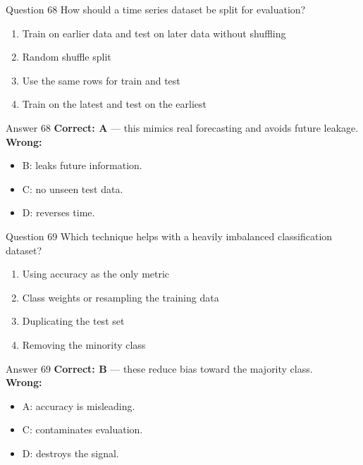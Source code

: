 \documentclass[aspectratio=169,11pt]{beamer}
\begin{document}
	\begin{frame}{Question 68}
		How should a time series dataset be split for evaluation?
		\begin{enumerate}[label=\Alph*.]
			\item Train on earlier data and test on later data without shuffling
			\item Random shuffle split
			\item Use the same rows for train and test
			\item Train on the latest and test on the earliest
		\end{enumerate}
	\end{frame}
	\begin{frame}{Answer 68}
		\textbf{Correct: A} --- this mimics real forecasting and avoids future leakage.\\
		\vspace{0.5em}
		\textbf{Wrong:}
		\begin{itemize}
			\item B: leaks future information.
			\item C: no unseen test data.
			\item D: reverses time.
		\end{itemize}
	\end{frame}
	
	\begin{frame}{Question 69}
		Which technique helps with a heavily imbalanced classification dataset?
		\begin{enumerate}[label=\Alph*.]
			\item Using accuracy as the only metric
			\item Class weights or resampling the training data
			\item Duplicating the test set
			\item Removing the minority class
		\end{enumerate}
	\end{frame}
	\begin{frame}{Answer 69}
		\textbf{Correct: B} --- these reduce bias toward the majority class.\\
		\vspace{0.5em}
		\textbf{Wrong:}
		\begin{itemize}
			\item A: accuracy is misleading.
			\item C: contaminates evaluation.
			\item D: destroys the signal.
		\end{itemize}
	\end{frame}
	
\end{document}
